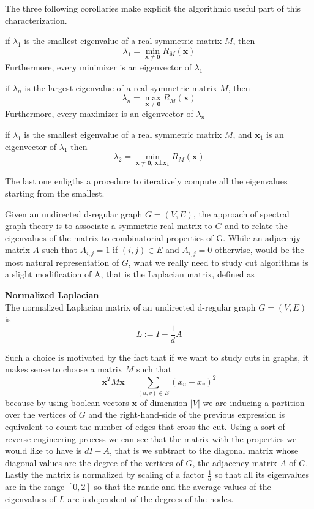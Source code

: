 The three following corollaries make explicit the algorithmic useful part of this characterization.

\begin{corollary}
	if $ \lambda_1 $ is the smallest eigenvalue of a real symmetric matrix $ M $, then
	\[ \lambda_1 = \min_{\mathbf{x} \ne \mathbf{0}}R_M(\mathbf{x}) \]
	Furthermore, every minimizer is an eigenvector of $ \lambda_1 $
\end{corollary}

\begin{corollary}
	if $ \lambda_n $ is the largest eigenvalue of a real symmetric matrix $ M $, then
	\[ \lambda_n = \max_{\mathbf{x} \ne \mathbf{0}}R_M(\mathbf{x}) \]
	Furthermore, every maximizer is an eigenvector of $ \lambda_n $
\end{corollary}

\begin{corollary}
	if $ \lambda_1 $ is the smallest eigenvalue of a real symmetric matrix $ M $, and $ \mathbf{x}_1 $ is an eigenvector of $ \lambda_1 $ then
	\[ \lambda_2 = \min_{\mathbf{x} \ne \mathbf{0}, \, \mathbf{x} \bot \mathbf{x_1}} R_M(\mathbf{x})  \]
\end{corollary}

The last one enligths a procedure to iteratively compute all the eigenvalues starting from the smallest.


Given an undirected d-regular graph $G=(V,E)$, the approach of spectral graph theory is to associate a symmetric real matrix to $ G $ and to relate the eigenvalues of the matrix to combinatorial properties of G. While an adjacenjy matrix $ A $ such that $ A_{i,j}=1 $ if $ (i,j) \in E $ and $ A_{i,j}=0 $ otherwise, would be the most natural representation of $ G $, what we really need to study cut algorithms is a slight modification of A, that is the Laplacian matrix, defined as
\begin{definition}{\textbf{Normalized Laplacian}} \\
The normalized Laplacian matrix of an undirected d-regular graph $ G=(V,E)  $ is
\[L:= I-\frac{1}{d}A\]
\end{definition}
Such a choice is motivated by the fact that if we want to study cuts in graphs, it makes sense to choose a matrix $ M $ such that
\[\mathbf{x}^TM\mathbf{x} = \sum_{(u,v)\in E}(x_u-x_v)^2\]
because by using boolean vectors $ \mathbf{x} $ of dimension $ |V| $ we are inducing a partition over the vertices of $ G $ and the right-hand-side of the previous expression is equivalent to count the number of edges that cross the cut.
Using a sort of reverse engineering process we can see that the matrix with the properties we would like to have is $ dI-A $, that is we subtract to the diagonal matrix whose diagonal values are the degree of the vertices of $ G $, the adjacency matrix $ A $ of $ G $.
Lastly the matrix is normalized by scaling of a factor $ \frac{1}{d} $ so that all its eigenvalues are in the range $ [0,2] $ so that the rande and the average values of the eigenvalues of $ L $ are independent of the degrees of the nodes.

